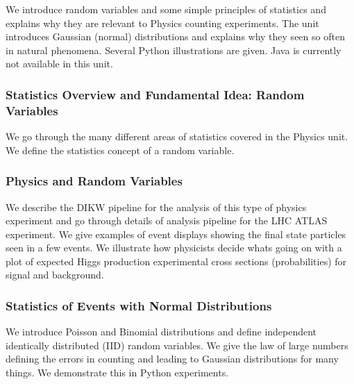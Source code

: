 We introduce random variables and some simple principles of statistics
and explains why they are relevant to Physics counting experiments. The
unit introduces Gaussian (normal) distributions and explains why they
seen so often in natural phenomena. Several Python illustrations are
given. Java is currently not available in this unit.


\subsubsection{Statistics Overview and Fundamental Idea: Random
Variables}\label{statistics-overview-and-fundamental-idea-random-variables}

We go through the many different areas of statistics covered in the
Physics unit. We define the statistics concept of a random variable.


\subsubsection{Physics and Random
Variables}\label{physics-and-random-variables}

We describe the DIKW pipeline for the analysis of this type of physics
experiment and go through details of analysis pipeline for the LHC ATLAS
experiment. We give examples of event displays showing the final state
particles seen in a few events. We illustrate how physicists decide
whats going on with a plot of expected Higgs production experimental
cross sections (probabilities) for signal and background.



\subsubsection{Statistics of Events with Normal
Distributions}\label{statistics-of-events-with-normal-distributions}

We introduce Poisson and Binomial distributions and define independent
identically distributed (IID) random variables. We give the law of large
numbers defining the errors in counting and leading to Gaussian
distributions for many things. We demonstrate this in Python
experiments.

